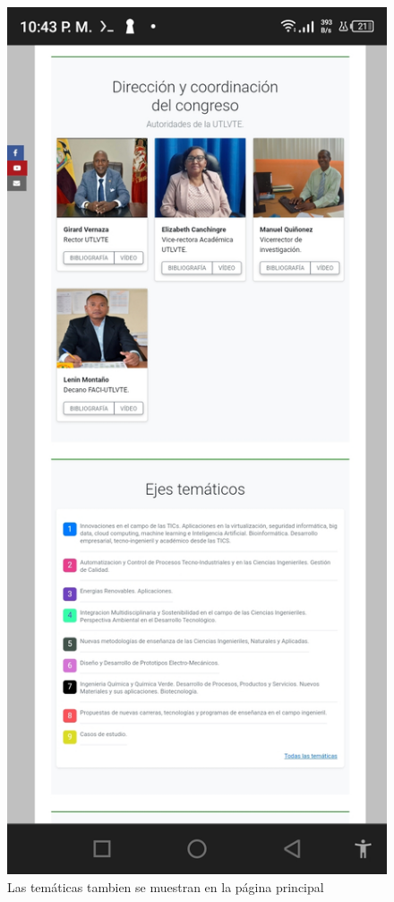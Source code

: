 \documentclass[a4paper,14px]{article}
\begin{document}
\hspace{0.5cm}
\begin{minipage}[H]{0.5\linewidth}
  \begin{figure}[H]
    \centering
    \includegraphics[scale=0.3]{index2.jpg}
    \caption{Las temáticas tambien se muestran en la página principal}
    \label{fig:tematicas2}
  \end{figure}
\end{minipage}
\end{document}
